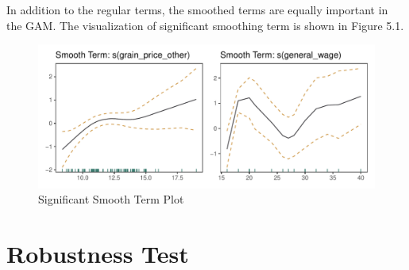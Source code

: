 In addition to the regular terms, the smoothed terms are equally important in the GAM. The visualization of significant smoothing term is shown in Figure 5.1.

\begin{figure}[h]
    \centering
    \caption{Significant Smooth Term Plot}
    \includegraphics[width=.95\textwidth]{../03_outputs/smoothterm.pdf}
\end{figure}

\section{Robustness Test}

